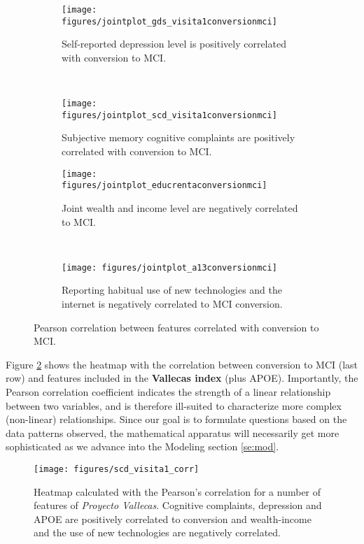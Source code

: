 \documentclass[11pt]{article}
\theoremstyle{definition}
\theoremstyle{remark}
\begin{document}
\begin{figure}[H]
    \centering
    \begin{subfigure}[t]{0.45\textwidth}
        \centering
        \texttt{[image: figures/jointplot\_gds\_visita1conversionmci]}
        \caption{Self-reported depression level is positively correlated with conversion to MCI.}
    \end{subfigure}
    ~ 
    \begin{subfigure}[t]{0.45\textwidth}
        \centering
        \texttt{[image: figures/jointplot\_scd\_visita1conversionmci]}
        \caption{Subjective memory cognitive complaints are positively correlated with conversion to MCI.}
    \end{subfigure}%
    
     \begin{subfigure}[t]{0.45\textwidth}
        \centering
        \texttt{[image: figures/jointplot\_educrentaconversionmci]}
        \caption{Joint wealth and income level are negatively correlated to MCI.}
    \end{subfigure}
    ~ 
    \begin{subfigure}[t]{0.45\textwidth}
        \centering
        \texttt{[image: figures/jointplot\_a13conversionmci]}
        \caption{Reporting habitual use of new technologies and the internet is negatively correlated to MCI conversion.}
    \end{subfigure}%
   
    \caption{Pearson correlation between features correlated with conversion to MCI.} \label{fig:multico}
\end{figure}

Figure \ref{fig:heatmappearson} shows the heatmap with the correlation between conversion to MCI (last row) and features included in the \textbf{Vallecas index} (plus APOE). 
Importantly, the Pearson correlation coefficient indicates the strength of a linear relationship between two variables, and is therefore ill-suited to characterize more complex (non-linear) relationships.
Since our goal is to formulate questions based on the data patterns observed, the mathematical apparatus will necessarily get more sophisticated as we advance into the Modeling section \ref{se:mod}. 
 
 \begin{figure}[h!]
        \centering
        \texttt{[image: figures/scd\_visita1\_corr]}
        \caption{Heatmap calculated with the Pearson's correlation for a number of features of \emph{Proyecto Vallecas}. Cognitive complaints, depression and APOE are positively correlated to conversion and wealth-income and the use of new technologies are negatively correlated. 
        } \label{fig:heatmappearson}
\end{figure}
\end{document}
